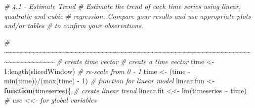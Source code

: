 \documentclass[
]{article}
\newenvironment{Shaded}{\begin{snugshade}}{\end{snugshade}}
\newcommand{\CommentTok}[1]{\textcolor[rgb]{0.56,0.35,0.01}{\textit{#1}}}
\newcommand{\ControlFlowTok}[1]{\textcolor[rgb]{0.13,0.29,0.53}{\textbf{#1}}}
\newcommand{\DecValTok}[1]{\textcolor[rgb]{0.00,0.00,0.81}{#1}}
\newcommand{\FunctionTok}[1]{\textcolor[rgb]{0.00,0.00,0.00}{#1}}
\newcommand{\NormalTok}[1]{#1}
\newcommand{\OtherTok}[1]{\textcolor[rgb]{0.56,0.35,0.01}{#1}}
\newcommand{\SpecialCharTok}[1]{\textcolor[rgb]{0.00,0.00,0.00}{#1}}
\begin{document}
\begin{Shaded}
\begin{Highlighting}[]
\CommentTok{\# 4.1 {-} Estimate Trend}
\CommentTok{\# Estimate the trend of each time series using linear, quadratic and cubic }
\CommentTok{\# regression. Compare your results and use appropriate plots and/or tables }
\CommentTok{\# to confirm your observations.}

\CommentTok{\# \textasciitilde{}\textasciitilde{}\textasciitilde{}\textasciitilde{}\textasciitilde{}\textasciitilde{}\textasciitilde{}\textasciitilde{}\textasciitilde{}\textasciitilde{}\textasciitilde{}\textasciitilde{}\textasciitilde{}\textasciitilde{}\textasciitilde{}\textasciitilde{}\textasciitilde{}\textasciitilde{}\textasciitilde{}\textasciitilde{}\textasciitilde{}\textasciitilde{}\textasciitilde{}\textasciitilde{}\textasciitilde{}\textasciitilde{}\textasciitilde{}\textasciitilde{}\textasciitilde{}\textasciitilde{}\textasciitilde{}\textasciitilde{}\textasciitilde{}\textasciitilde{}\textasciitilde{}\textasciitilde{}\textasciitilde{}\textasciitilde{}\textasciitilde{}\textasciitilde{}\textasciitilde{}\textasciitilde{}\textasciitilde{}\textasciitilde{}\textasciitilde{}\textasciitilde{}\textasciitilde{}\textasciitilde{}\textasciitilde{}\textasciitilde{}\textasciitilde{}\textasciitilde{}\textasciitilde{}\textasciitilde{}\textasciitilde{}\textasciitilde{}\textasciitilde{}\textasciitilde{}\textasciitilde{}\textasciitilde{}\textasciitilde{}\textasciitilde{}\textasciitilde{}\textasciitilde{}\textasciitilde{}\textasciitilde{}\textasciitilde{}\textasciitilde{}\textasciitilde{}\textasciitilde{}\textasciitilde{}\textasciitilde{}\textasciitilde{}\textasciitilde{}\textasciitilde{}\textasciitilde{}\textasciitilde{}}
\CommentTok{\# create time vector}
\CommentTok{\# create a time vector}
\NormalTok{time }\OtherTok{\textless{}{-}} \DecValTok{1}\SpecialCharTok{:}\FunctionTok{length}\NormalTok{(slicedWindow)}
\CommentTok{\# re{-}scale from 0 {-} 1}
\NormalTok{time }\OtherTok{\textless{}{-}}\NormalTok{ (time }\SpecialCharTok{{-}} \FunctionTok{min}\NormalTok{(time))}\SpecialCharTok{/}\NormalTok{(}\FunctionTok{max}\NormalTok{(time) }\SpecialCharTok{{-}} \DecValTok{1}\NormalTok{)}
\CommentTok{\# function for linear model}
\NormalTok{linear.fun }\OtherTok{\textless{}{-}} \ControlFlowTok{function}\NormalTok{(timeseries)\{}
  \CommentTok{\# create linear trend}
\NormalTok{  linear.fit }\OtherTok{\textless{}\textless{}{-}} \FunctionTok{lm}\NormalTok{(timeseries }\SpecialCharTok{\textasciitilde{}}\NormalTok{ time) }\CommentTok{\# use \textless{}\textless{}{-} for global variables}

\end{Highlighting}
\end{Shaded}
\end{document}

